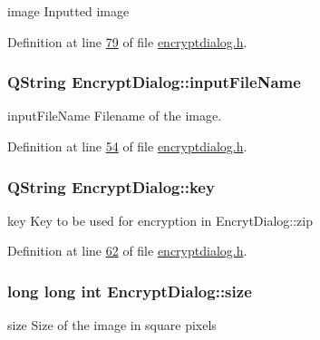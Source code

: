image Inputted image 



Definition at line \hyperlink{encryptdialog_8h_source_l00079}{79} of file \hyperlink{encryptdialog_8h_source}{encryptdialog.\-h}.

\hypertarget{class_encrypt_dialog_a859b1bc2f032a247632b879bf8663d0b}{
\subsubsection[{input\-File\-Name}]{\setlength{\rightskip}{0pt plus 5cm}Q\-String Encrypt\-Dialog\-::input\-File\-Name}}\label{class_encrypt_dialog_a859b1bc2f032a247632b879bf8663d0b}


input\-File\-Name Filename of the image. 



Definition at line \hyperlink{encryptdialog_8h_source_l00054}{54} of file \hyperlink{encryptdialog_8h_source}{encryptdialog.\-h}.

\hypertarget{class_encrypt_dialog_a1afdef3c665fb0d0fae06d1df8e84951}{
\subsubsection[{key}]{\setlength{\rightskip}{0pt plus 5cm}Q\-String Encrypt\-Dialog\-::key}}\label{class_encrypt_dialog_a1afdef3c665fb0d0fae06d1df8e84951}


key Key to be used for encryption in Encryt\-Dialog\-::zip 



Definition at line \hyperlink{encryptdialog_8h_source_l00062}{62} of file \hyperlink{encryptdialog_8h_source}{encryptdialog.\-h}.

\hypertarget{class_encrypt_dialog_a7fff26f838ab50f807744cd2c4bed033}{
\subsubsection[{size}]{\setlength{\rightskip}{0pt plus 5cm}long long int Encrypt\-Dialog\-::size}}\label{class_encrypt_dialog_a7fff26f838ab50f807744cd2c4bed033}


size Size of the image in square pixels 




